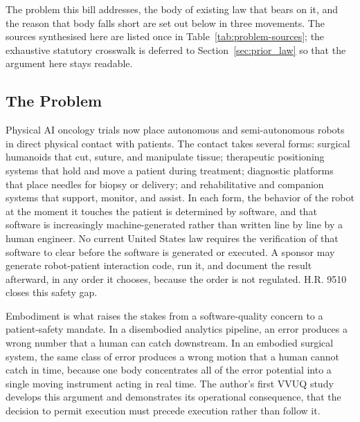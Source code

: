
The problem this bill addresses, the body of existing law that bears on it, and
the reason that body falls short are set out below in three movements. The
sources synthesised here are listed once in Table~\ref{tab:problem-sources}; the
exhaustive statutory crosswalk is deferred to
Section~\ref{sec:prior_law} so that the argument here stays readable.

\clearpage

\subsection{The Problem}

Physical AI oncology trials now place autonomous and semi-autonomous robots in
direct physical contact with patients. The contact takes several forms:
surgical humanoids that cut, suture, and manipulate tissue; therapeutic
positioning systems that hold and move a patient during treatment; diagnostic
platforms that place needles for biopsy or delivery; and rehabilitative and
companion systems that support, monitor, and assist. In each form, the behavior
of the robot at the moment it touches the patient is determined by software, and
that software is increasingly machine-generated rather than written line by line
by a human engineer. No current United States law requires the verification of
that software to clear before the software is generated or executed. A sponsor
may generate robot-patient interaction code, run it, and document the result
afterward, in any order it chooses, because the order is not regulated. H.R. 9510 closes this safety gap.

Embodiment is what raises the stakes from a software-quality concern to a
patient-safety mandate. In a disembodied analytics pipeline, an error produces a
wrong number that a human can catch downstream. In an embodied surgical system,
the same class of error produces a wrong motion that a human cannot catch in
time, because one body concentrates all of the error potential into a single
moving instrument acting in real time. The author's first VVUQ study
\cite{kawchak2026vvuq01} develops this argument and demonstrates its operational
consequence, that the decision to permit execution must precede execution rather
than follow it.


